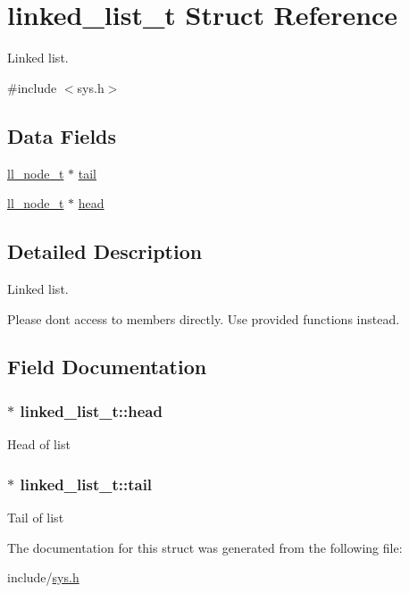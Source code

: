 \hypertarget{structlinked__list__t}{}\section{linked\+\_\+list\+\_\+t Struct Reference}
\label{structlinked__list__t}


Linked list.  




{\ttfamily \#include $<$sys.\+h$>$}

\subsection*{Data Fields}
\begin{DoxyCompactItemize}
\item 
\hyperlink{structll__node__t}{ll\+\_\+node\+\_\+t} $\ast$ \hyperlink{structlinked__list__t_af5d010a866e6f1490a87934d19d09678}{tail}
\item 
\hyperlink{structll__node__t}{ll\+\_\+node\+\_\+t} $\ast$ \hyperlink{structlinked__list__t_a64ea186cf01cd4d97256e207d5c495a2}{head}
\end{DoxyCompactItemize}


\subsection{Detailed Description}
Linked list. 

Please don\textquotesingle{}t access to members directly. Use provided functions instead. 

\subsection{Field Documentation}
\subsubsection[{\texorpdfstring{head}{head}}]{$\ast$ linked\+\_\+list\+\_\+t\+::head}\hypertarget{structlinked__list__t_a64ea186cf01cd4d97256e207d5c495a2}{}\label{structlinked__list__t_a64ea186cf01cd4d97256e207d5c495a2}
Head of list 
\subsubsection[{\texorpdfstring{tail}{tail}}]{$\ast$ linked\+\_\+list\+\_\+t\+::tail}\hypertarget{structlinked__list__t_af5d010a866e6f1490a87934d19d09678}{}\label{structlinked__list__t_af5d010a866e6f1490a87934d19d09678}
Tail of list 

The documentation for this struct was generated from the following file\+:\begin{DoxyCompactItemize}
\item 
include/\hyperlink{sys_8h}{sys.\+h}\end{DoxyCompactItemize}
